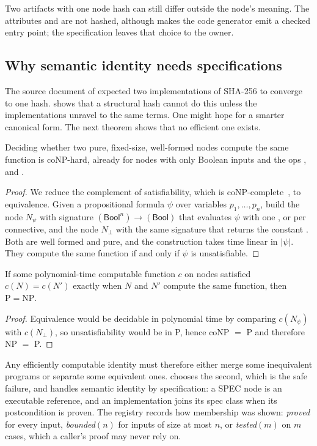 Two artifacts with one node hash can still differ outside the node's meaning. The attributes
 and  are not hashed, although  makes the code generator emit a
checked entry point; the specification leaves that choice to the owner.

\subsection{Why semantic identity needs specifications}

The source document of \VG{} expected two implementations of SHA-256 to converge to one hash.
 shows that a structural hash cannot do this unless the implementations
unravel to the same terms. One might hope for a smarter canonical form. The next theorem shows
that no efficient one exists.

\begin{theorem}\label{thm:conp}
Deciding whether two pure, fixed-size, well-formed nodes compute the same function is
coNP-hard, already for nodes with only Boolean inputs and the ops ,  and
.
\end{theorem}
\begin{proof}
We reduce the complement of satisfiability, which is coNP-complete~\cite{cook1971complexity},
to equivalence. Given a propositional formula $\psi$ over variables $p_1,\dots,p_n$, build the
node $N_\psi$ with signature $(\mathsf{Bool}^n)\to(\mathsf{Bool})$ that evaluates $\psi$ with
one ,  or  per connective, and the node $N_\bot$ with the same
signature that returns the constant . Both are well formed and pure, and the
construction takes time linear in $|\psi|$. They compute the same function if and only if
$\psi$ is unsatisfiable.
\end{proof}

\begin{corollary}\label{cor:no-canon}
If some polynomial-time computable function $c$ on nodes satisfied $c(N)=c(N')$ exactly when
$N$ and $N'$ compute the same function, then $\mathrm{P}=\mathrm{NP}$.
\end{corollary}
\begin{proof}
Equivalence would be decidable in polynomial time by comparing $c(N_\psi)$ with $c(N_\bot)$,
so unsatisfiability would be in P, hence coNP $=$ P and therefore NP $=$ P.
\end{proof}

Any efficiently computable identity must therefore either merge some inequivalent programs or
separate some equivalent ones. \VG{} chooses the second, which is the safe failure, and handles
semantic identity by specification: a SPEC node is an executable reference, and an
implementation joins its spec class when its postcondition  is
proven. The registry records how membership was shown: \emph{proved} for every input,
\emph{bounded}$(n)$ for inputs of size at most $n$, or \emph{tested}$(m)$ on $m$ cases, which a
caller's proof may never rely on.

